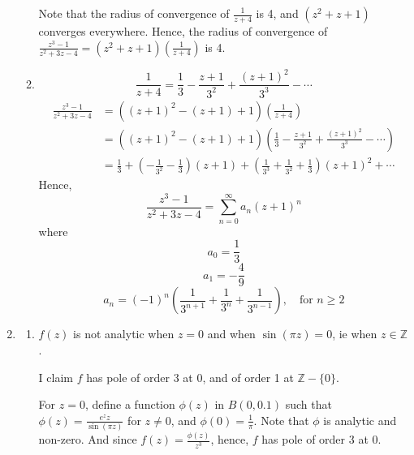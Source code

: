 \documentclass{article}
\newcommand{\paren}[1]{\left(#1\right)}
\newcommand{\Z}{\mathbb{Z}}
\begin{document}
\begin{enumerate}
\begin{enumerate}
Note that the radius of convergence of $\frac{1}{z+4}$ is 4, and $(z^2 + z + 1)$ converges everywhere. Hence, the radius of convergence of $\frac{z^3-1}{z^2+3z-4} = (z^2 + z + 1)\paren{\frac{1}{z+4}}$ is 4.
\item
\[
\frac{1}{z+4} = \frac{1}{3} - \frac{z+1}{3^2} + \frac{(z+1)^2}{3^3} - \cdots
\]
\begin{align*}
\frac{z^3-1}{z^2+3z-4} &= ((z+1)^2 - (z+1) + 1)\paren{\frac{1}{z+4}} \\
    &= ((z+1)^2 - (z+1) + 1)\paren{\frac{1}{3} - \frac{z+1}{3^2} + \frac{(z+1)^2}{3^3} - \cdots} \\
    &= \frac{1}{3} + \paren{-\frac{1}{3^2} - \frac{1}{3}}(z+1) + \paren{\frac{1}{3^3} + \frac{1}{3^2} + \frac{1}{3}}(z+1)^2 + \cdots
\end{align*}
Hence,
\[
\frac{z^3-1}{z^2+3z-4} = \sum_{n=0}^\infty a_n (z+1)^n
\]
where
\[a_0 = \frac{1}{3}\]
\[a_1 = -\frac{4}{9}\]
\[
a_n = (-1)^n\paren{\frac{1}{3^{n+1}} + \frac{1}{3^{n}} + \frac{1}{3^{n-1}}}, \quad \text{for }n\geq 2
\]
\end{enumerate}
\item
\begin{enumerate}
\item $f(z)$ is not analytic when $z=0$ and when $\sin(\pi z)=0$, ie when $z \in \Z$.

I claim $f$ has pole of order 3 at 0, and of order 1 at $\Z - \{0\}$.

For $z=0$, define a function $\phi(z)$ in $B(0,0.1)$ such that $\phi(z) = \frac{e^z z}{\sin(\pi z)}$ for $z \neq 0$, and $\phi(0) = \frac{1}{\pi}$. Note that $\phi$ is analytic and non-zero. And since $f(z) = \frac{\phi(z)}{z^3}$, hence, $f$ has pole of order 3 at 0.


\end{enumerate}
\end{enumerate}
\end{document}
